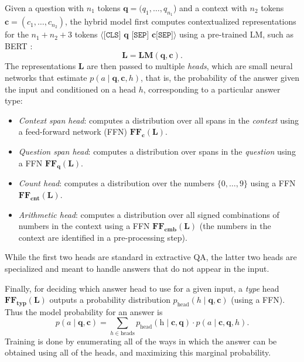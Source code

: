 \documentclass[11pt,a4paper]{article}
\newcommand\question{\mathbf{q}}
\newcommand\context{\mathbf{c   }}
\begin{document}
Given a question with $n_1$ tokens $\question = (q_1, \dots, q_{n_1}$) and a
context with $n_2$ tokens $\context = (c_1, \dots, c_{n_2})$, the hybrid model
first computes contextualized representations for the $n_1+n_2+3$ tokens
$\langle \texttt{[CLS] }\question\texttt{ [SEP] }\context\texttt{[SEP]} \rangle$
using a pre-trained LM, such as \textsc{BERT} \cite{devlin2018bert}:
\[
\mathbf{L} = \textbf{LM}(\question, \context).
\]
The representations $\mathbf{L}$ are then passed to multiple \emph{heads}, which
are small neural networks that estimate $p(a \mid \question, \context, h)$, that
is, the probability of the answer given the input and conditioned on a
head $h$, corresponding to a particular answer type:
\begin{itemize}[topsep=0pt,itemsep=0pt,parsep=0pt,partopsep=0pt,leftmargin=*]
    \item \emph{Context span head}: computes a distribution over all spans in the \emph{context} using a feed-forward network (FFN) $\textbf{FF}_\context(\mathbf{L})$.
    \item \emph{Question span head}: computes a distribution over spans in the \emph{question} 
    using a FFN $\textbf{FF}_\question(\mathbf{L})$.
    \item \emph{Count head}: computes a distribution over the numbers $\{0,\ldots,9\}$ using a FFN $\textbf{FF}_{\mathbf{cnt}}(\mathbf{L})$.
    \item \emph{Arithmetic head}: computes a distribution over all signed combinations of numbers in the context using a FFN $\textbf{FF}_{\mathbf{cmb}}(\mathbf{L})$ (the numbers in the context are identified in a pre-processing step).
\end{itemize}
While the first two heads are standard in extractive QA, the latter two heads are specialized and meant to handle answers that do not appear in the input.

Finally, for deciding which answer head to use for a
given input, a \emph{type} head $\textbf{FF}_{\mathbf{typ}}(\mathbf{L})$ outputs
a probability distribution $p_\text{head}(h \mid \question, \context)$ (using a FFN).
Thus the model probability for an answer is 
\[
p(a \mid \question, \context) = \sum_{h \in \text{heads}} p_\text{head}(\text{h} \mid
\context,\question) \cdot p(a \mid \context, \question, h).
\]
Training is done by enumerating all of the ways in which the answer can be obtained using all of the heads, and maximizing this marginal probability.
\end{document}
